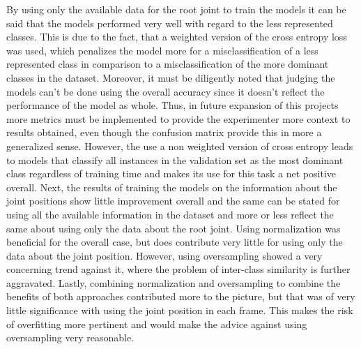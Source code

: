 		By using only the available data for the root joint to train the models it can be said that the models performed very well with regard to the less represented classes. This is due to the fact, that a weighted version of the cross entropy loss was used, which penalizes the model more for a misclassification of a less represented class in comparison to a misclassification of the more dominant classes in the dataset. Moreover, it must be diligently noted that judging the models can't be done using the overall accuracy since it doesn't reflect the performance of the model as whole. Thus, in future expansion of this projects more metrics must be implemented to provide the experimenter more context to results obtained, even though the confusion matrix provide this in more a generalized sense. However, the use a non weighted version of cross entropy leads to models that classify all instances in the validation set as the most dominant class regardless of training time and makes its use for this task a net positive overall. Next, the results of training the models on the information about the joint positions show little improvement overall and the same can be stated for using all the available information in the dataset and more or less reflect the same about using only the data about the root joint.\newline
		Using normalization was beneficial for the overall case, but does contribute very little for using only the data about the joint position. However, using oversampling showed a very concerning trend against it, where the problem of inter-class similarity is further aggravated. Lastly, combining normalization and oversampling to combine the benefits of both approaches contributed more to the picture, but that was of very little significance with using the joint position in each frame. This makes the risk of overfitting more pertinent and would make the advice against using oversampling very reasonable.
